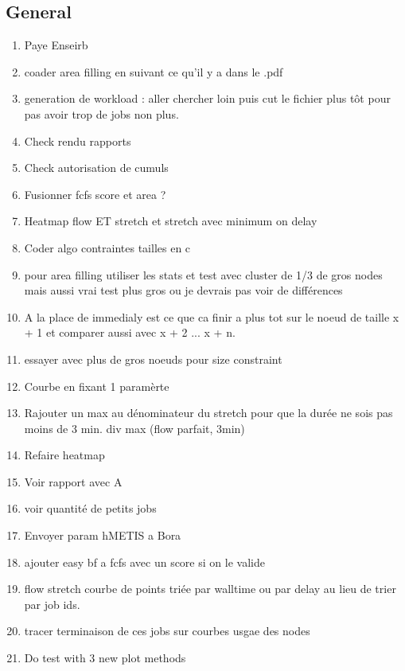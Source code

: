 \documentclass[a4paper]{article}
\begin{document}
	\subsection{General}
		\begin{enumerate}
			\item Paye Enseirb
			\item coader area filling en suivant ce qu'il y a dans le .pdf
			\item generation de workload : aller chercher loin puis cut le fichier plus tôt pour pas avoir trop de jobs non plus.
			
			\item Check rendu rapports
			\item Check autorisation de cumuls
			
			\item Fusionner fcfs score et area ?
			\item Heatmap flow ET stretch et stretch avec minimum on delay
			\item Coder algo contraintes tailles en c
			\item pour area filling utiliser les stats et test avec cluster de 1/3 de gros nodes mais aussi vrai test plus gros ou je devrais pas voir de différences
			\item A la place de immedialy est ce que ca finir a plus tot sur le noeud de taille x + 1 et comparer aussi avec x + 2 ... x + n.
			\item essayer avec plus de gros noeuds pour size constraint
			\item Courbe en fixant 1 paramèrte
			\item Rajouter un max au dénominateur du stretch pour que la durée ne sois pas moins de 3 min. div max (flow parfait, 3min)
			\item Refaire heatmap
			\item Voir rapport avec A
			\item voir quantité de petits jobs
			\item Envoyer param hMETIS a Bora
			\item ajouter easy bf a fcfs avec un score si on le valide
								
			\item flow stretch courbe de points triée par walltime ou par delay au lieu de trier par job ids.
						
			\item tracer terminaison de ces jobs sur courbes usgae des nodes
					
			\item Do test with 3 new plot methods
						

\end{enumerate}
\end{document}

